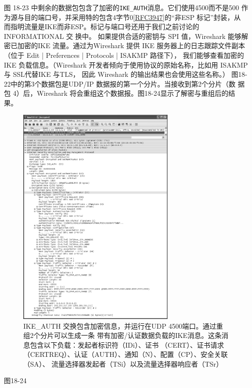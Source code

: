 图 18-23 中剩余的数据包包含了加密的\verb|IKE_AUTH|消息。它们使用4500而不是500
作为源与目的端口号，并采用特的包含4字节0\href{https://www.rfc-editor.org/rfc/rfc3947}{[RFC3947]}的“非ESP 标记”封装，从
而指明流量是IKE而非ESP。标记与端口号还用于我们之前讨论的 INFORMATIONAL 交
换中。
如果提供合适的密钥与 SPI 值，Wireshark 能够解密已加密的IKE 流量。通过为Wireshark
提供 IKE 服务器上的日志跟踪文件副本（位于 Edit | Preferences | Protocols | ISAKMP 路径下），
我们能够查看加密的IKE 负载信息。（Wireshark 开发者倾向于使用协议的原始名称，比如用
ISAKMP 与 SSL代替IKE 与TLS，
因此 Wireshark 的输出结果也会使用这些名称。）
图18-22中的第3个数据包是UDP/IP 数据报的第一个分片。当接收到第2个分片（数
据包 4）后，Wireshark 将会重组这个数据报。图18-24显示了解密与重组后的结果。
\begin{figure}[!htb]
    \centering
	\includegraphics[width=0.7\textwidth]{imgs/18/18-24.png}
	\caption{IKE\_AUTH 交换包含加密信息，并运行在UDP 4500端口。通过重组2个分片可以生成一条
            带有加密/认证数据负载的IKE消息。这条消息包含以下负载：发起者标识符（IDi）、证书
            （CERT）、证书请求（CERTREQ）、认证（AUTH）、通知（N）、配置（CP）、安全关联（SA）、
            流量选择器发起者（TSi）以及流量选择器响应者（TSr）}
\end{figure}
图18-24

